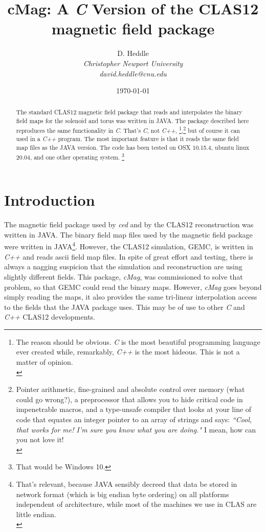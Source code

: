 \documentclass{article}
\title{\textbf{cMag:} A \emph{C} Version of the CLAS12 magnetic field package}
\author{D. Heddle  \\
	\emph{Christopher Newport University}  \\
         \emph{david.heddle@cnu.edu}\\
	}
\date{\today}
\begin{document}
\maketitle
\begin{abstract}
   The standard CLAS12 magnetic field package that reads and interpolates the binary field maps for the solenoid and torus was written in JAVA. The package described here reproduces the same functionality in \emph{C}. That's  \emph{C}, not \emph{C++}, 
\footnote{The reason should be obvious. \emph{C} is the most beautiful programming language ever created while, remarkably, \emph{C++} is the most hideous. This is not a matter of opinion.\\},\footnote{Pointer arithmetic, fine-grained and absolute control over memory (what could go wrong?), a preprocessor that allows you to hide critical code in impenetrable macros, and a type-unsafe compiler that looks at your line of code that equates an integer pointer to an array of strings and says: \textit{``Cool, that works for me! I'm sure you know what you are doing."} I mean, how can you not love it!\\}
 but of course it can used in a \emph{C++} program. The most important feature is that it reads the same field map files as the JAVA version. The code has been tested on OSX 10.15.4, ubuntu linux 20.04, and one other operating system. \footnote[666]{That would be Windows 10.}


\end{abstract}
\newpage

\tableofcontents
\newpage

\section {Introduction}
The magnetic field package used by \textit{ced} and by the CLAS12 reconstruction was written in JAVA. The  binary field map files used by the magnetic field package were written in JAVA\footnote{That's relevant, because JAVA sensibly decreed that data be stored in network format (which is big endian byte ordering) on all platforms independent of architecture, while most of the machines we use in CLAS are little endian.\\}. However, the CLAS12 simulation, GEMC, is written in \textit{C++} and reads ascii field map files. In spite of great effort and testing, there is always a nagging suspicion that the simulation and reconstruction are using slightly different fields. This package, \textit{cMag}, was commissioned to solve that problem, so that GEMC could read the binary maps. However, \textit{cMag} goes beyond simply reading the maps, it also provides the same tri-linear interpolation access to the fields that the JAVA package uses. This may be of use to other \textit{C} and \textit{C++} CLAS12 developments. 
\end{document}
